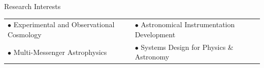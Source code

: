 \begin{rSection}{Research Interests}

\begin{center}
\begin{tabular}{ll}
$\bullet$ Experimental and Observational Cosmology & $\bullet$ Astronomical Instrumentation Development \\
$\bullet$ Multi-Messenger Astrophysics             & $\bullet$ Systems Design for Physics \& Astronomy
\end{tabular}
\end{center}
\end{rSection}
